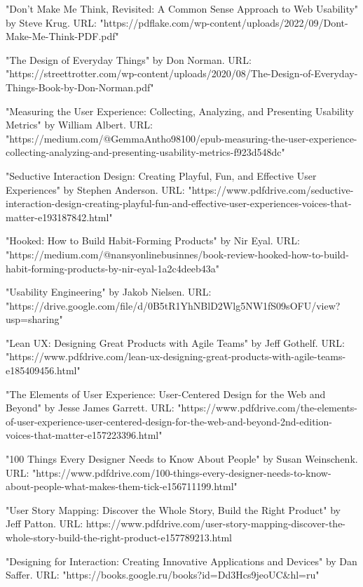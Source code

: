 \documentclass{article}
\begin{document}
"Don't Make Me Think, Revisited: A Common Sense Approach to Web Usability" by Steve Krug. URL:
"https://pdflake.com/wp-content/uploads/2022/09/Dont-Make-Me-Think-PDF.pdf"

"The Design of Everyday Things" by Don Norman. URL:
"https://streettrotter.com/wp-content/uploads/2020/08/The-Design-of-Everyday-Things-Book-by-Don-Norman.pdf"

"Measuring the User Experience: Collecting, Analyzing, and Presenting Usability Metrics" by William Albert. URL: "https://medium.com/@GemmaAntho98100/epub-measuring-the-user-experience-collecting-analyzing-and-presenting-usability-metrics-f923d548dc"

"Seductive Interaction Design: Creating Playful, Fun, and Effective User Experiences" by Stephen Anderson. URL: "https://www.pdfdrive.com/seductive-interaction-design-creating-playful-fun-and-effective-user-experiences-voices-that-matter-e193187842.html"

"Hooked: How to Build Habit-Forming Products" by Nir Eyal. URL: "https://medium.com/@nansyonlinebusinnes/book-review-hooked-how-to-build-habit-forming-products-by-nir-eyal-1a2c4deeb43a"

"Usability Engineering" by Jakob Nielsen. URL: "https://drive.google.com/file/d/0B5tR1YhNBlD2Wlg5NW1fS09sOFU/view?usp=sharing"

"Lean UX: Designing Great Products with Agile Teams" by Jeff Gothelf. URL:
"https://www.pdfdrive.com/lean-ux-designing-great-products-with-agile-teams-e185409456.html"

"The Elements of User Experience: User-Centered Design for the Web and Beyond" by Jesse James Garrett. URL: "https://www.pdfdrive.com/the-elements-of-user-experience-user-centered-design-for-the-web-and-beyond-2nd-edition-voices-that-matter-e157223396.html"

"100 Things Every Designer Needs to Know About People" by Susan Weinschenk. URL: "https://www.pdfdrive.com/100-things-every-designer-needs-to-know-about-people-what-makes-them-tick-e156711199.html"

"User Story Mapping: Discover the Whole Story, Build the Right Product" by Jeff Patton. URL: https://www.pdfdrive.com/user-story-mapping-discover-the-whole-story-build-the-right-product-e157789213.html

"Designing for Interaction: Creating Innovative Applications and Devices" by Dan Saffer. URL: "https://books.google.ru/books?id=Dd3Hcs9jeoUC&hl=ru"
\end{document}

